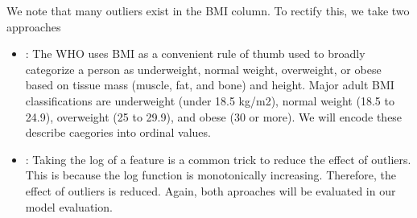 \documentclass[letterpaper,10pt,english]{jupyterBook}
\begin{document}
\sphinxAtStartPar
We note that many outliers exist in the BMI column. To rectify this, we take two approaches
\begin{itemize}
\item {} 
\sphinxAtStartPar
{}: The WHO uses BMI as a convenient rule of thumb used to broadly categorize a person as underweight, normal weight, overweight, or obese based on tissue mass (muscle, fat, and bone) and height. Major adult BMI classifications are underweight (under 18.5 kg/m2), normal weight (18.5 to 24.9), overweight (25 to 29.9), and obese (30 or more). We will encode these describe caegories into ordinal values.

\item {} 
\sphinxAtStartPar
{}: Taking the log of a feature is a common trick to reduce the effect of outliers. This is because the log function is monotonically increasing. Therefore, the effect of outliers is reduced.
Again, both aproaches will be evaluated in our model evaluation.

\end{itemize}
\end{document}
